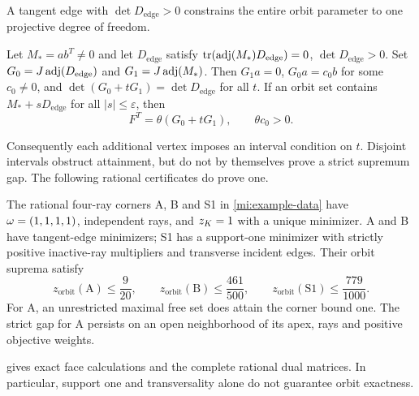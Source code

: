 A tangent edge with $\det D_{\mathrm{edge}}>0$ constrains the entire orbit parameter to
one projective degree of freedom.

\begin{lemma}\label{mi:pencil}
Let $M_*=ab^T\ne0$ and let $D_{\mathrm{edge}}$ satisfy
$\operatorname{tr}(\operatorname{adj}(M_*)D_{\mathrm{edge}})=0$, $\det D_{\mathrm{edge}}>0$. Set
$G_0=J\operatorname{adj}(D_{\mathrm{edge}})$ and $G_1=J\operatorname{adj}(M_*)$.
Then $G_1a=0$, $G_0a=c_0b$ for some $c_0\ne0$, and
$\det(G_0+tG_1)=\det D_{\mathrm{edge}}$ for all $t$.
If an orbit set contains $M_*+sD_{\mathrm{edge}}$ for all $|s|\le\varepsilon$, then
\[
 F^T=\theta(G_0+tG_1),\qquad \theta c_0>0.
\]
\end{lemma}
\noindent
Consequently each additional vertex imposes an interval condition on $t$.
Disjoint intervals obstruct attainment, but do not by themselves prove a
strict supremum gap. The following rational certificates do prove one.

\begin{theorem}\label{mi:examples}
The rational four-ray corners A, B and S1 in \cref{mi:example-data} have
$\omega=(1,1,1,1)$, independent rays, and $z_K=1$ with a unique minimizer.
A and B have tangent-edge minimizers; S1 has a support-one minimizer with
strictly positive inactive-ray multipliers and transverse incident edges.
Their orbit suprema satisfy
\[
 z_{\mathrm{orbit}}(\mathrm A)\le\frac9{20},\qquad
 z_{\mathrm{orbit}}(\mathrm B)\le\frac{461}{500},\qquad
 z_{\mathrm{orbit}}(\mathrm{S1})\le\frac{779}{1000}.
\]
For A, an unrestricted maximal free set does attain the corner bound one.
The strict gap for A persists on an open neighborhood of its apex, rays
and positive objective weights.
\end{theorem}
\noindent
{} gives exact face calculations and the complete
rational dual matrices. In particular, support one and transversality
alone do not guarantee orbit exactness.

